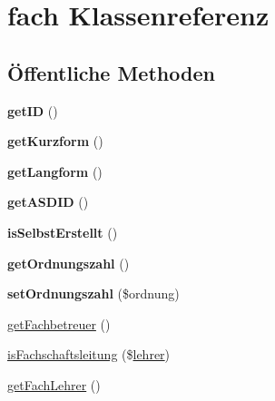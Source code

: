 \hypertarget{classfach}{}\section{fach Klassenreferenz}
\label{classfach}
\subsection*{Öffentliche Methoden}
\begin{DoxyCompactItemize}
\item 
\mbox{\label{classfach_a16b63c8a42e672595508703383169177}} 
{\bfseries get\+ID} ()
\item 
\mbox{\label{classfach_a0583da69b92f01481825e5421b068251}} 
{\bfseries get\+Kurzform} ()
\item 
\mbox{\label{classfach_acd9ea6cedcea4a2a37b77b6d9ea4d8c7}} 
{\bfseries get\+Langform} ()
\item 
\mbox{\label{classfach_a9c658ea75ff75689aad055fd368924a5}} 
{\bfseries get\+A\+S\+D\+ID} ()
\item 
\mbox{\label{classfach_ab726672928e1ee88cd3ccfd10257de9b}} 
{\bfseries is\+Selbst\+Erstellt} ()
\item 
\mbox{\label{classfach_a5bca8e60d4e86bcf8684bf8ffb371261}} 
{\bfseries get\+Ordnungszahl} ()
\item 
\mbox{\label{classfach_aef52843b494bd2bbf9304bc724ad8bc4}} 
{\bfseries set\+Ordnungszahl} (\$ordnung)
\item 
\mbox{\hyperlink{classfach_a50b3eefb5de55bc8271101dcbc7c403e}{get\+Fachbetreuer}} ()
\item 
\mbox{\hyperlink{classfach_a813e31188d3ec8ef4a84c8ffdee2d88f}{is\+Fachschaftsleitung}} (\$\mbox{\hyperlink{classlehrer}{lehrer}})
\item 
\mbox{\hyperlink{classfach_ae3203656307692c082b24827b4f6252f}{get\+Fach\+Lehrer}} ()
\end{DoxyCompactItemize}
